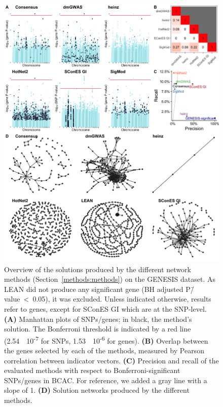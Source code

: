 \documentclass[draft,twocolumn, 11pt]{article}
\begin{document}
\begin{figure}[htbp]
  \centering
  \includegraphics[height=.75\textheight]{./figures/figure_1.png}
  \caption{Overview of the solutions produced by the different network methods (Section~\ref{methods:methods}) on the GENESIS dataset. As LEAN did not produce any significant gene (BH adjusted P\=/value~<~0.05), it was excluded. Unless indicated otherwise, results refer to genes, except for SConES GI which are at the SNP-level. \textbf{(A)} Manhattan plots of SNPs/genes; in black, the method's solution. The Bonferroni threshold is indicated by a red line (2.54~\texttimes{}~10\textsuperscript{-7} for SNPs, 1.53~\texttimes{}~10\textsuperscript{-6} for genes). \textbf{(B)} Overlap between the genes selected by each of the methods, measured by Pearson correlation between indicator vectors. \textbf{(C)} Precision and recall of the evaluated methods with respect to Bonferroni-significant SNPs/genes in BCAC. For reference, we added a gray line with a slope of 1. \textbf{(D)} Solution networks produced by the different methods.}
  \label{fig:solution_overview}
\end{figure}
\end{document}
